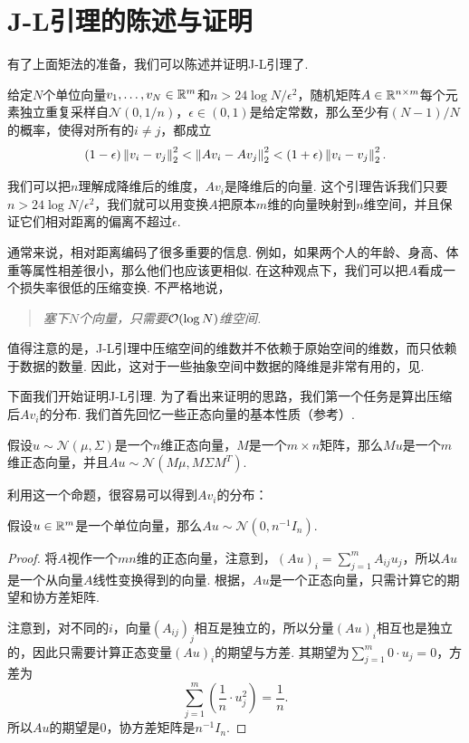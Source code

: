 \section{J-L引理的陈述与证明}
有了上面矩法的准备，我们可以陈述并证明J-L引理了.
\begin{theorem}\label{thm:johnson-lindenstrauss-lemma}
给定$N$个单位向量$v_1,\dots,v_N\in\mathbb{R}^m$和$n >24\log N/\epsilon^2$，随机矩阵$A\in \mathbb{R}^{n\times m}$每个元素独立重复采样自$\mathcal N(0,1/n)$，$\epsilon \in (0,1)$是给定常数，那么至少有$(N-1)/N$的概率，使得对所有的$i\neq j$，都成立
    \[
        (1 - \epsilon)\left\|v_i-v_j\right\|_2^2 <\left\|Av_i-Av_j\right\|_2^2 < (1 + \epsilon)\left\|v_i-v_j\right\|_2^2.
    \]
\end{theorem}

我们可以把$n$理解成降维后的维度，$Av_i$是降维后的向量. 这个引理告诉我们只要$n > 24\log N/\epsilon^2$，我们就可以用变换$A$把原本$m$维的向量映射到$n$维空间，并且保证它们相对距离的偏离不超过$\epsilon$.

通常来说，相对距离编码了很多重要的信息. 例如，如果两个人的年龄、身高、体重等属性相差很小，那么他们也应该更相似. 在这种观点下，我们可以把$A$看成一个损失率很低的压缩变换. 不严格地说，
\begin{quotation}
    \emph{塞下$N$个向量，只需要$\mathcal{O}(\log N)$维空间.}
\end{quotation}

值得注意的是，J-L引理中压缩空间的维数并不依赖于原始空间的维数，而只依赖于数据的数量. 因此，这对于一些抽象空间中数据的降维是非常有用的，见.

下面我们开始证明J-L引理. 为了看出来证明的思路，我们第一个任务是算出压缩后$Av_i$的分布. 我们首先回忆一些正态向量的基本性质（参考）. 

\begin{proposition}\label{prop:gaussian-vector}
假设$u\sim\mathcal N(\mu,\Sigma)$是一个$n$维正态向量，$M$是一个$m\times n$矩阵，那么$Mu$是一个$m$维正态向量，并且$Au\sim \mathcal N(M\mu,M\Sigma M^T)$.
\end{proposition}

利用这一个命题，很容易可以得到$Av_i$的分布：

\begin{lemma}\label{lemma:gaussian-vector}
    假设$u\in\mathbb{R}^m$是一个单位向量，那么$Au\sim \mathcal N(0,n^{-1}I_n)$.
\end{lemma}
\begin{proof}
    将$A$视作一个$mn$维的正态向量，注意到，$(Au)_i = \sum_{j=1}^m A_{ij}u_j$，所以$Au$是一个从向量$A$线性变换得到的向量. 根据，$Au$是一个正态向量，只需计算它的期望和协方差矩阵. 
   
   注意到，对不同的$i$，向量$(A_{ij})_{j}$相互是独立的，所以分量$(Au)_i$相互也是独立的，因此只需要计算正态变量$(Au)_i$的期望与方差. 其期望为$\sum_{j=1}^m 0\cdot u_j = 0$，方差为
   \[\sum_{j=1}^m \left(\frac{1}{n}\cdot u_j^2\right) = \frac{1}{n}.\] 
   所以$Au$的期望是$0$，协方差矩阵是$n^{-1}I_n$.
\end{proof}

